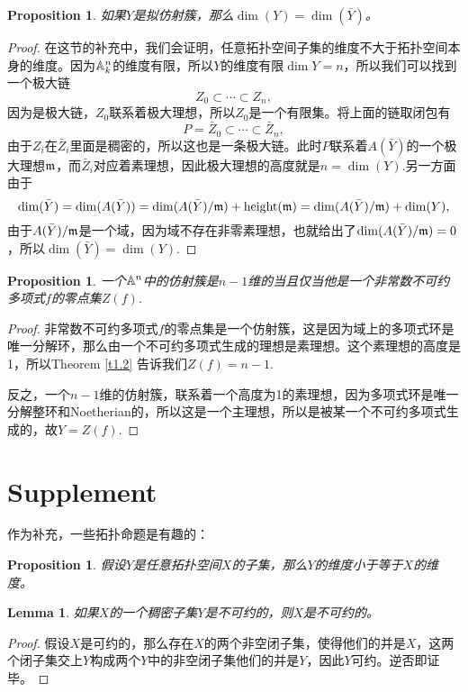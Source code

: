 \documentclass[9pt]{extarticle}
\theoremstyle{plain}%
\newtheorem{pro}[defi]{Proposition}%
\newtheorem{lem}[defi]{Lemma}%
\begin{document}
\begin{pro}
如果$Y$是拟仿射簇，那么$\dim(Y)=\dim(\bar{Y})$。
\end{pro}
\begin{proof}在这节的补充中，我们会证明，任意拓扑空间子集的维度不大于拓扑空间本身的维度。因为$\mathbb{A}^n_k$的维度有限，所以$Y$的维度有限$\dim Y=n$，所以我们可以找到一个极大链
\[
	Z_0\subset \cdots \subset Z_n,
\]
因为是极大链，$Z_0$联系着极大理想，所以$Z_0$是一个有限集。将上面的链取闭包有
\[
	P=\bar{Z}_0\subset \cdots \subset \bar{Z}_n,
\]
由于$Z_i$在$\bar{Z}_i$里面是稠密的，所以这也是一条极大链。此时$P$联系着$A(\bar{Y})$的一个极大理想$\mathfrak{m}$，而$\bar{Z}_i$对应着素理想，因此极大理想的高度就是$n=\dim(Y)$.另一方面由于
\[
	\dim (\bar{Y})=\dim (A(\bar{Y}))=\dim (A(\bar{Y})/\mathfrak{m}) +\operatorname{height}(\mathfrak{m})=\dim (A(\bar{Y})/\mathfrak{m}) +\dim(Y),
\]
由于$A(\bar{Y})/\mathfrak{m}$是一个域，因为域不存在非零素理想，也就给出了$\dim (A(\bar{Y})/\mathfrak{m})=0$，所以$\dim (\bar{Y})=\dim(Y)$.
\end{proof}
\begin{pro}
一个$\mathbb{A}^n$中的仿射簇是$n-1$维的当且仅当他是一个非常数不可约多项式$f$的零点集$Z(f)$.
\end{pro}
\begin{proof}
非常数不可约多项式$f$的零点集是一个仿射簇，这是因为域上的多项式环是唯一分解环，那么由一个不可约多项式生成的理想是素理想。这个素理想的高度是1，所以Theorem \ref{t1.2} 告诉我们$Z(f)=n-1$.

反之，一个$n-1$维的仿射簇，联系着一个高度为1的素理想，因为多项式环是唯一分解整环和Noetherian的，所以这是一个主理想，所以是被某一个不可约多项式生成的，故$Y=Z(f)$.
\end{proof}

\section*{Supplement}
作为补充，一些拓扑命题是有趣的：
\begin{pro}
	假设$Y$是任意拓扑空间$X$的子集，那么$Y$的维度小于等于$X$的维度。
	\label{p1.8}
\end{pro}

\begin{lem}如果$X$的一个稠密子集$Y$是不可约的，则$X$是不可约的。
\label{l1.1}
\end{lem}
\begin{proof}
假设$X$是可约的，那么存在$X$的两个非空闭子集，使得他们的并是$X$，这两个闭子集交上$Y$构成两个$Y$中的非空闭子集他们的并是$Y$，因此$Y$可约。逆否即证毕。
\end{proof}
\end{document}
